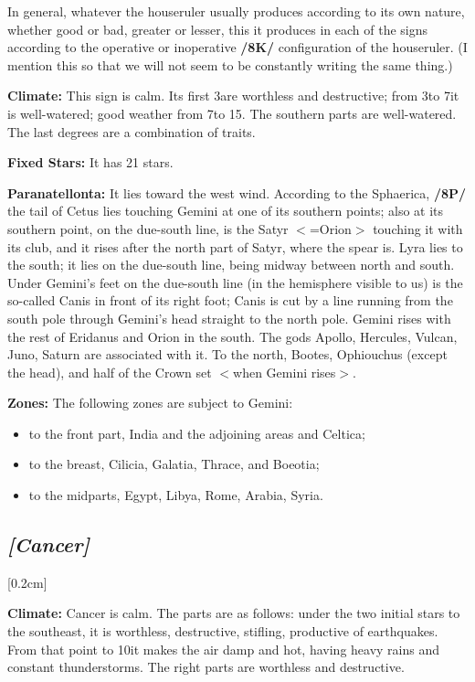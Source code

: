 \mndl[0.2cm]
In general, whatever the houseruler usually produces according to its own nature, whether good or bad, greater or lesser, this it produces in each of the signs according to the operative or inoperative \textbf{/8K/} configuration of the houseruler. (I mention this so that we will not seem to be constantly writing the same thing.)

\textbf{Climate:} This sign is calm. Its first 3\deg are worthless and destructive; from 3\deg to 7\deg it is well-watered; good weather from 7\deg to 15\deg. The southern parts are well-watered. The last degrees are a combination of traits.

\textbf{Fixed Stars:} It has 21 stars. 

\textbf{Paranatellonta:} It lies toward the west wind. According to the Sphaerica, \textbf{/8P/} the tail of Cetus lies touching Gemini at one of its southern points; also at its southern point, on the due-south line, is the Satyr
$<$=Orion$>$ touching it with its club, and it rises after the north part of Satyr, where the spear is. Lyra lies to the south; it lies on the due-south line, being midway between north and south. Under Gemini’s feet on the due-south line (in the hemisphere visible to us) is the so-called Canis in front of its right foot; Canis is cut by a line running from the south pole through Gemini's head straight to the north pole. 
Gemini rises with the rest of Eridanus and Orion in the south. The gods Apollo, Hercules, Vulcan, Juno, Saturn are associated with it. To the north, Bootes, Ophiouchus (except the head), and half of the Crown set $<$when
Gemini rises$>$. 

\textbf{Zones:} The following zones are subject to Gemini: 
\begin{itemize}
\item to the front part, India and the adjoining areas
and Celtica; 
\item to the breast, Cilicia, Galatia, Thrace, and Boeotia; 
\item to the midparts, Egypt, Libya, Rome, Arabia, Syria.
\end{itemize}

\secbr
\subsection{\textit{[Cancer]}}
[0.2cm]

\textbf{Climate:} Cancer is calm. The parts are as follows: under the two initial stars to the southeast, it is worthless, destructive, stifling, productive of earthquakes. From that point to 10\deg it makes the air damp and hot, having heavy rains and constant thunderstorms. The right parts are worthless and destructive. 

